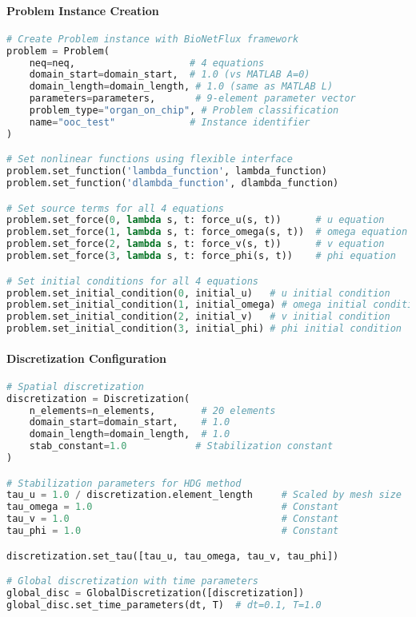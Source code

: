 \paragraph{Problem Instance Creation}
\begin{lstlisting}[language=Python, caption=Python Problem Instance Setup]
# Create Problem instance with BioNetFlux framework
problem = Problem(
    neq=neq,                    # 4 equations
    domain_start=domain_start,  # 1.0 (vs MATLAB A=0) 
    domain_length=domain_length, # 1.0 (same as MATLAB L)
    parameters=parameters,       # 9-element parameter vector
    problem_type="organ_on_chip", # Problem classification
    name="ooc_test"             # Instance identifier
)

# Set nonlinear functions using flexible interface
problem.set_function('lambda_function', lambda_function)  
problem.set_function('dlambda_function', dlambda_function)

# Set source terms for all 4 equations
problem.set_force(0, lambda s, t: force_u(s, t))      # u equation
problem.set_force(1, lambda s, t: force_omega(s, t))  # omega equation  
problem.set_force(2, lambda s, t: force_v(s, t))      # v equation
problem.set_force(3, lambda s, t: force_phi(s, t))    # phi equation

# Set initial conditions for all 4 equations
problem.set_initial_condition(0, initial_u)   # u initial condition
problem.set_initial_condition(1, initial_omega) # omega initial condition
problem.set_initial_condition(2, initial_v)   # v initial condition
problem.set_initial_condition(3, initial_phi) # phi initial condition
\end{lstlisting}

\paragraph{Discretization Configuration}
\begin{lstlisting}[language=Python, caption=Python Discretization Setup]
# Spatial discretization
discretization = Discretization(
    n_elements=n_elements,        # 20 elements
    domain_start=domain_start,    # 1.0
    domain_length=domain_length,  # 1.0
    stab_constant=1.0            # Stabilization constant
)

# Stabilization parameters for HDG method
tau_u = 1.0 / discretization.element_length     # Scaled by mesh size
tau_omega = 1.0                                 # Constant
tau_v = 1.0                                     # Constant  
tau_phi = 1.0                                   # Constant

discretization.set_tau([tau_u, tau_omega, tau_v, tau_phi])

# Global discretization with time parameters
global_disc = GlobalDiscretization([discretization])
global_disc.set_time_parameters(dt, T)  # dt=0.1, T=1.0
\end{lstlisting}

